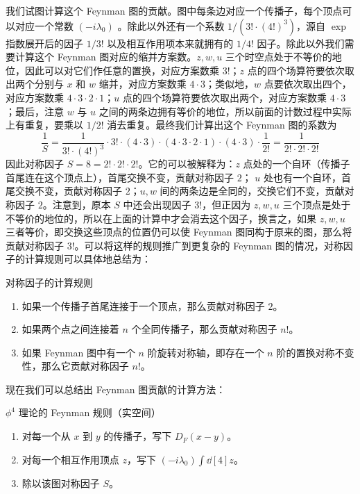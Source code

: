 我们试图计算这个 Feynman 图的贡献。图中每条边对应一个传播子，每个顶点可以对应一个常数 $(-i\lambda_0)$ 。除此以外还有一个系数 $1/(3!\cdot (4!)^3)$，源自 $\exp$ 指数展开后的因子 $1/3!$ 以及相互作用项本来就拥有的 $1/4!$ 因子。除此以外我们需要计算这个 Feynman 图对应的缩并方案数。$z,w,u$ 三个时空点处于不等价的地位，因此可以对它们作任意的置换，对应方案数乘 $3!$；$z$ 点的四个场算符要依次取出两个分别与 $x$ 和 $w$ 缩并，对应方案数乘 $4\cdot 3$；类似地，$w$ 点要依次取出四个，对应方案数乘 $4\cdot 3\cdot 2\cdot 1$；$u$ 点的四个场算符要依次取出两个，对应方案数乘 $4\cdot 3$；最后，注意 $w$ 与 $u$ 之间的两条边拥有等价的地位，所以前面的计数过程中实际上有重复，要乘以 $1/2!$ 消去重复。最终我们计算出这个 Feynman 图的系数为
\begin{equation}
\frac{1}{S}=\frac{1}{3!\cdot (4!)^3}\cdot 3! \cdot (4\cdot 3)\cdot (4\cdot 3\cdot 2\cdot 1)\cdot (4\cdot 3)\cdot \frac{1}{2!}=\frac{1}{2!\cdot 2!\cdot 2!}
\end{equation}
因此对称因子 $S=8=2!\cdot 2!\cdot 2!$。它的可以被解释为：$z$ 点处的一个自环（传播子首尾连在这个顶点上），首尾交换不变，贡献对称因子 $2$； $u$ 处也有一个自环，首尾交换不变，贡献对称因子 $2$；$u,w$ 间的两条边是全同的，交换它们不变，贡献对称因子 $2$。注意到，原本 $S$ 中还会出现因子 $3!$，但正因为 $z,w,u$ 三个顶点是处于不等价的地位的，所以在上面的计算中才会消去这个因子，换言之，如果 $z,w,u$ 三者等价，即交换这些顶点的位置仍可以使 Feynman 图同构于原来的图，那么将贡献对称因子 $3!$。可以将这样的规则推广到更复杂的 Feynman 图的情况，对称因子的计算规则可以具体地总结为：
\begin{theorem}{对称因子的计算规则}
\begin{enumerate}
\item 如果一个传播子首尾连接于一个顶点，那么贡献对称因子 $2$。
\item 如果两个点之间连接着 $n$ 个全同传播子，那么贡献对称因子 $n!$。
\item 如果 Feynman 图中有一个 $n$ 阶旋转对称轴，即存在一个 $n$ 阶的置换对称不变性，那么它贡献对称因子 $n!$。
\end{enumerate}
\end{theorem}
现在我们可以总结出 Feynman 图贡献的计算方法：
\begin{theorem}{$\phi^4$ 理论的 Feynman 规则（实空间）}
\begin{enumerate}
\item 对每一个从 $x$ 到 $y$ 的传播子，写下 $D_F(x-y)$。
\item 对每一个相互作用顶点 $z$，写下 $(-i\lambda_0)\int \dd[4]z$。
\item 除以该图对称因子 $S$。
\end{enumerate}
\end{theorem}